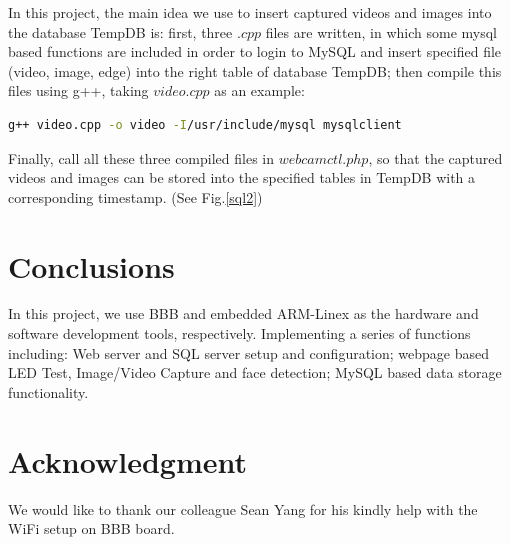 \documentclass[12pt,journal,draftclsnofoot,onecolumn]{IEEEtran}
\begin{document}
In this project, the main idea we use to insert captured videos and images into the database TempDB is: first, three $.cpp$ files are written, in which some mysql based functions are included in order to login to MySQL and insert specified file (video, image, edge) into the right table of database TempDB; then compile this files using g++, taking $video.cpp$ as an example:
\begin{lstlisting}[language={bash}]
g++ video.cpp -o video -I/usr/include/mysql mysqlclient
\end{lstlisting}
Finally, call all these three compiled files in $webcamctl.php$, so that the captured videos and images can be stored into the specified tables in TempDB with a corresponding timestamp. (See Fig.\ref{sql2})

\section{Conclusions}\label{Con}
In this project, we use BBB and embedded ARM-Linex as the hardware and software development tools, respectively. Implementing a series of functions including: Web server and SQL server setup and configuration; webpage based LED Test, Image/Video Capture and face detection;  MySQL based data storage functionality.

\section*{Acknowledgment}
We would like to thank our colleague Sean Yang  for his kindly help with the WiFi setup on BBB board.



\end{document}
